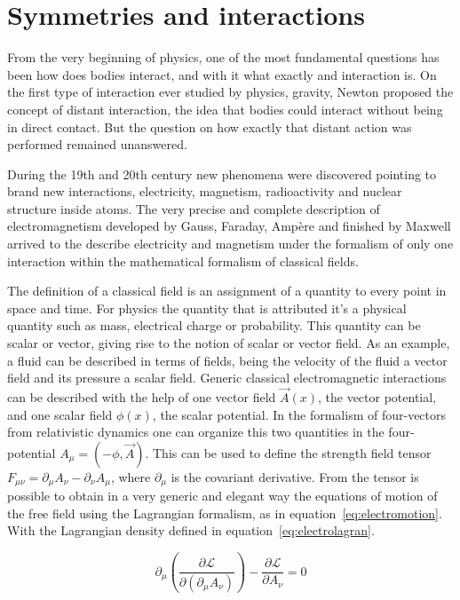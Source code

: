 \section{Symmetries and interactions}
\label{sec:symm}

From the very beginning of physics, one of the most fundamental questions has been how does bodies interact, and with it what exactly and interaction is. On the first type of interaction ever studied by physics, gravity, Newton proposed the concept of distant interaction, the idea that bodies could interact without being in direct contact. But the question on how exactly that distant action was performed remained unanswered. 

During the 19th and 20th century new phenomena were discovered pointing to brand new interactions, electricity, magnetism, radioactivity and nuclear structure inside atoms. The very precise and complete description of electromagnetism developed by Gauss, Faraday, Amp\`{e}re and finished by Maxwell arrived to the describe electricity and magnetism under the formalism of only one interaction within the mathematical formalism of classical fields. 

The definition of a classical field is an assignment of a quantity to every point in space and time. For physics the quantity that is attributed it's a physical quantity such as mass, electrical charge or probability. This quantity can be scalar or vector, giving rise to the notion of scalar or vector field. As an example, a fluid can be described in terms of fields, being the velocity of the fluid a vector field and its pressure a scalar field. Generic classical electromagnetic interactions can be described with the help of one vector field $\vec{A}(x)$, the vector potential, and one scalar field $\phi(x)$, the scalar potential. In the formalism of four-vectors from relativistic dynamics one can organize this two quantities in the four-potential $A_{\mu}=(-\phi,\vec{A})$. This can be used to define the strength field tensor $F_{\mu\nu}=\partial_{\mu}A_{\nu}-\partial_{\nu}A_{\mu}$, where $\partial_{\mu}$ is the covariant derivative. From the tensor is possible to obtain in a very generic and elegant way the equations of motion of the free field using the Lagrangian formalism, as in equation~\ref{eq:electromotion}. With the Lagrangian density defined in equation~\ref{eq:electrolagran}.

\begin{equation}
  \label{eq:electromotion}
  \partial_{\mu}\left( \frac{\partial \mathcal{L}}{\partial (\partial_{\mu}A_{\nu})} \right) -\frac{\partial \mathcal{L}}{\partial A_{\nu}}=0
\end{equation}


